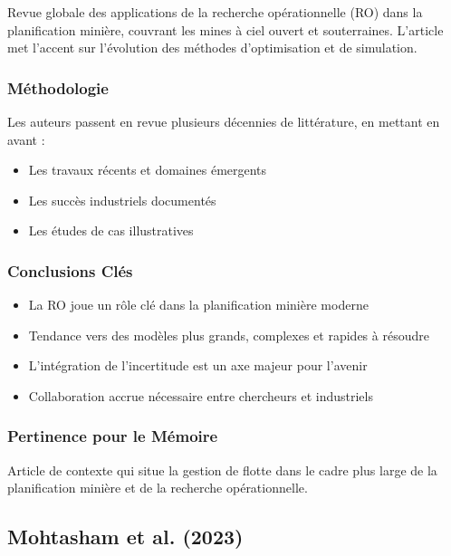 \documentclass[12pt,a4paper]{article}
\begin{document}
Revue globale des applications de la recherche opérationnelle (RO) dans la planification minière, couvrant les mines à ciel ouvert et souterraines. L'article met l'accent sur l'évolution des méthodes d'optimisation et de simulation.

\subsubsection{Méthodologie}

Les auteurs passent en revue plusieurs décennies de littérature, en mettant en avant :
\begin{itemize}
    \item Les travaux récents et domaines émergents
    \item Les succès industriels documentés
    \item Les études de cas illustratives
\end{itemize}

\subsubsection{Conclusions Clés}

\begin{itemize}
    \item La RO joue un rôle clé dans la planification minière moderne
    \item Tendance vers des modèles plus grands, complexes et rapides à résoudre
    \item L'intégration de l'incertitude est un axe majeur pour l'avenir
    \item Collaboration accrue nécessaire entre chercheurs et industriels
\end{itemize}

\subsubsection{Pertinence pour le Mémoire}

Article de contexte qui situe la gestion de flotte dans le cadre plus large de la planification minière et de la recherche opérationnelle.

\subsection{Mohtasham et al. (2023)}
\end{document}
